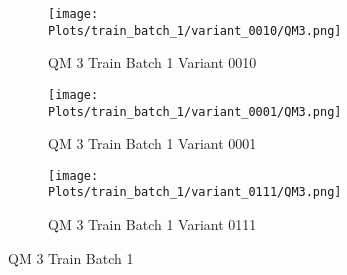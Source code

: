 \documentclass{DissertateFigs}
\begin{document}
\begin{figure}[t!]
\medskip

    \begin{subfigure}{0.47\textwidth}
    \texttt{[image: Plots/train\_batch\_1/variant\_0010/QM3.png]}
    \caption{QM 3 Train Batch 1 Variant 0010}
    \end{subfigure}
    \begin{subfigure}{0.47\textwidth}
    \texttt{[image: Plots/train\_batch\_1/variant\_0001/QM3.png]}
    \caption{QM 3 Train Batch 1 Variant 0001}
    \end{subfigure}

\medskip

    \begin{subfigure}{0.47\textwidth}
    \texttt{[image: Plots/train\_batch\_1/variant\_0111/QM3.png]}
    \caption{QM 3 Train Batch 1 Variant 0111}
    \end{subfigure}
\caption{QM 3 Train Batch 1}
    \end{figure}
\clearpage
\end{document}
